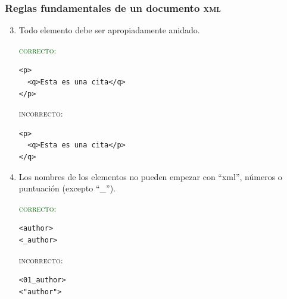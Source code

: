 \documentclass[%
  handout, %
  xcolor=svgnames]{beamer}
\newcommand*{\rojo}[1]{\textcolor[HTML]{8B0000}{#1}}
\newcommand*{\verde}[1]{\textcolor{DarkGreen}{#1}}
\newcommand*{\XML}{\textsc{xml}}
\begin{document}
\begin{frame}[fragile]
  \frametitle{Reglas fundamentales de un documento \XML}
  \begin{enumerate}
      \setcounter{enumi}{2}
    \item Todo elemento debe ser apropiadamente anidado.

      \medskip

      \begin{minipage}{0.4\linewidth}
      \verde{\textsc{correcto}:}
\begin{verbatim}
<p>
  <q>Esta es una cita</q>
</p>

\end{verbatim}        
    \end{minipage}%
      \hfill%
      \begin{minipage}{0.5\linewidth}
   \rojo{\textsc{incorrecto}:}
\begin{verbatim}
<p>
  <q>Esta es una cita</p>
</q>

\end{verbatim}
      \end{minipage}%
      
    \item Los nombres de los elementos no pueden empezar con \enquote{xml}, números o puntuación (excepto \enquote{\_}).

      \medskip
      
      \begin{minipage}{0.4\linewidth}
      \verde{\textsc{correcto}:}
\begin{verbatim}
<author>
<_author>
\end{verbatim}        
    \end{minipage}%
      \hfill%
      \begin{minipage}{0.5\linewidth}
   \rojo{\textsc{incorrecto}:}
\begin{verbatim}
<01_author>
<"author">
\end{verbatim}
      \end{minipage}%
  \end{enumerate}
\end{frame}
\end{document}
